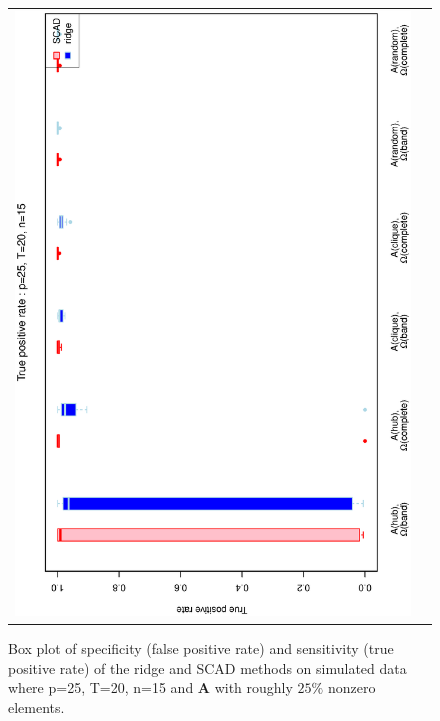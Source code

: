 \documentclass[a4paper]{article}
\begin{document}
\begin{figure}[h!]
\begin{tabular}{cc}
\includegraphics[scale=0.45,angle=270]{ROCtpr25T20N15_25.eps}
\end{tabular}
\caption{Box plot of specificity (false positive rate) and sensitivity (true positive rate) of the ridge and SCAD methods on simulated data where p=25, T=20,  n=15 and $\mathbf{A}$ with roughly $25\%$ nonzero elements.}
\label{figSM:RocP25T20N15_25}
\end{figure}

\end{document}
